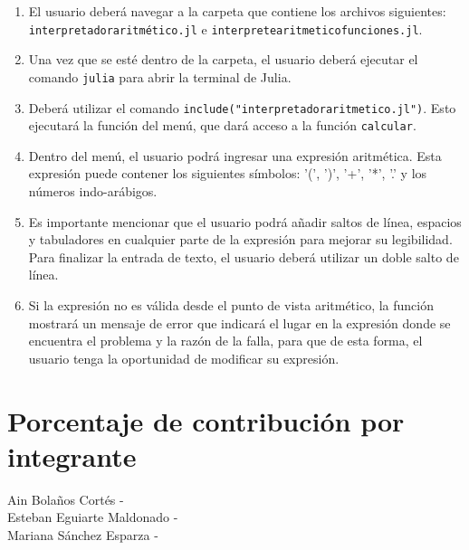 \documentclass{article}
\begin{document}
\begin{enumerate}
    \item El usuario deberá navegar a la carpeta que contiene los archivos siguientes: \texttt{interpretador\textunderscore aritmético.jl} e \texttt{interprete\textunderscore aritmetico\textunderscore funciones.jl}.

    \item Una vez que se esté dentro de la carpeta, el usuario deberá ejecutar el comando \texttt{julia} para abrir la terminal de Julia.

    \item Deberá utilizar el comando \texttt{include("interpretador\textunderscore aritmetico.jl")}. Esto ejecutará la función del menú, que dará acceso a la función \texttt{calcular}.

    \item Dentro del menú, el usuario podrá ingresar una expresión aritmética. Esta expresión puede contener los siguientes símbolos: '(', ')', '+', '*', '.' y los números indo-arábigos. 

    \item Es importante mencionar que el usuario podrá añadir saltos de línea, espacios y tabuladores en cualquier parte de la expresión para mejorar su legibilidad. Para finalizar la entrada de texto, el usuario deberá utilizar un doble salto de línea. 

    \item Si la expresión no es válida desde el punto de vista aritmético, la función mostrará un mensaje de error que indicará el lugar en la expresión donde se encuentra el problema y la razón de la falla, para que de esta forma, el usuario tenga la oportunidad de modificar su expresión.\\
\end{enumerate}


\section{Porcentaje de contribución por integrante}
Ain Bolaños Cortés -  \\
Esteban Eguiarte Maldonado -  \\
Mariana Sánchez Esparza - 
\end{document}
